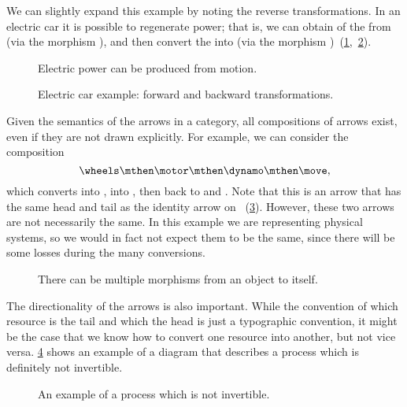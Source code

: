 We can slightly expand this example by noting the reverse transformations. In an electric car
it is possible to regenerate power; that is, we can obtain \rotationalmotion of the \wheels from
\translationalmotion (via the morphism \move), and then convert the \rotationalmotion into \electricpower (via the morphism \dynamo)~(\cref{fig:e6},~\cref{fig:e6-together}).

\begin{figure}[h!]
  \centering
  \caption{Electric power can be produced from motion.}
  \label{fig:e6}
\end{figure}

\begin{figure}[h!]
  \centering
  \caption{Electric car example: forward and backward transformations.\label{fig:e6-together}}
\end{figure}
Given the semantics of the arrows in a category, all compositions of arrows exist, even if they are not drawn
explicitly. For example, we can consider the composition
\begin{equation*}
    \wheels \mthen \motor \mthen \dynamo \mthen \move,
\end{equation*}
which converts \translationalmotion into \rotationalmotion, into \electricpower, then back to
\rotationalmotion and \translationalmotion. Note that this is an arrow that has the same head and tail as the identity arrow on \translationalmotion~(\cref{fig:e8}). However, these two arrows are not necessarily the same. In this example we are representing physical systems, so we would in fact not expect them to be the same, since there will be some losses during the many conversions.

\begin{figure}[h!]
  \centering
  \caption{There can be multiple morphisms from an object to itself.}
  \label{fig:e8}
\end{figure}

The directionality of the arrows is also important. While the convention of
which resource is the tail and which the head is just a typographic convention,
it might be the case that we know how to convert one resource into another, but
not vice versa. \cref{fig:e10} shows an example of a diagram that describes a process which is definitely
not invertible.

\begin{figure}[h!]
  \centering
  \caption{An example of a process which is not invertible. }
  \label{fig:e10}
\end{figure}



